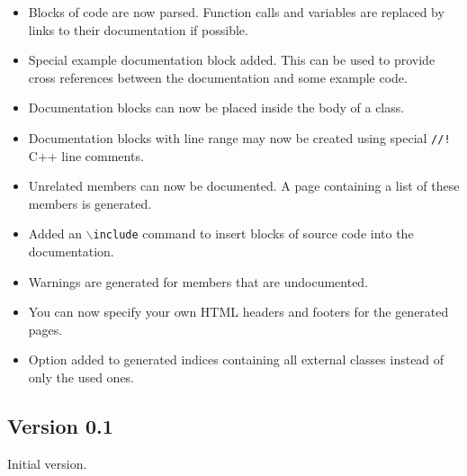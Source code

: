 \begin{itemize}
\item Blocks of code are now parsed. Function calls and variables are replaced by links to their documentation if possible. \item Special example documentation block added. This can be used to provide cross references between the documentation and some example code. \item Documentation blocks can now be placed inside the body of a class. \item Documentation blocks with line range may now be created using special {\tt //!} C++ line comments. \item Unrelated members can now be documented. A page containing a list of these members is generated. \item Added an {\tt $\backslash$include} command to insert blocks of source code into the documentation. \item Warnings are generated for members that are undocumented. \item You can now specify your own HTML headers and footers for the generated pages. \item Option added to generated indices containing all external classes instead of only the used ones. \end{itemize}


\subsection*{Version 0.1}

Initial version. 